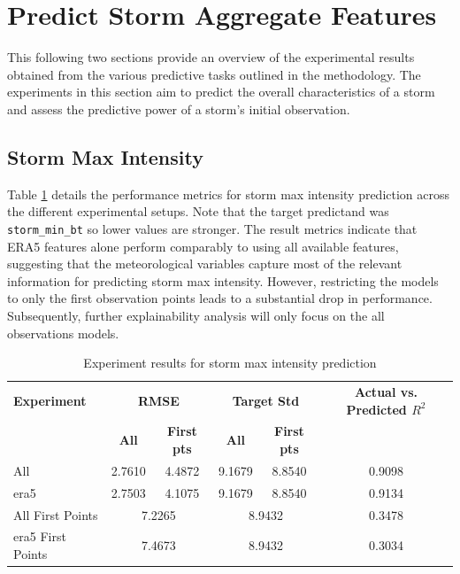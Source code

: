 \section{Predict Storm Aggregate Features}

This following two sections provide an overview of the experimental results obtained from the various predictive tasks outlined in the methodology. The experiments in this section aim to predict the overall characteristics of a storm and assess the predictive power of a storm's initial observation.

\subsection{Storm Max Intensity}

Table \ref{tab:storm_max_intensity_results} details the performance metrics for storm max intensity prediction across the different experimental setups. Note that the target predictand was \texttt{storm\_min\_bt} so lower values are stronger. The result metrics indicate that ERA5 features alone perform comparably to using all available features, suggesting that the meteorological variables capture most of the relevant information for predicting storm max intensity. However, restricting the models to only the first observation points leads to a substantial drop in performance. Subsequently, further explainability analysis will only focus on the all observations models.

\begin{table}[ht]
\centering
\caption{Experiment results for storm max intensity prediction}
\label{tab:storm_max_intensity_results}
\begin{tabular}{lccccc}
\hline
\textbf{Experiment} & \multicolumn{2}{c}{\textbf{RMSE}} & \multicolumn{2}{c}{\textbf{Target Std}} & \textbf{Actual vs. Predicted $R^2$} \\
\cline{2-5}
 & \textbf{All} & \textbf{First pts} & \textbf{All} & \textbf{First pts} &  \\
\hline
All              & 2.7610 & 4.4872 & 9.1679 & 8.8540 & 0.9098 \\
\acrshort{era5}             & 2.7503 & 4.1075 & 9.1679 & 8.8540 & 0.9134 \\
All First Points & \multicolumn{2}{c}{7.2265} & \multicolumn{2}{c}{8.9432} & 0.3478 \\
\acrshort{era5} First Points & \multicolumn{2}{c}{7.4673} & \multicolumn{2}{c}{8.9432} & 0.3034 \\
\hline
\end{tabular}
\end{table}

